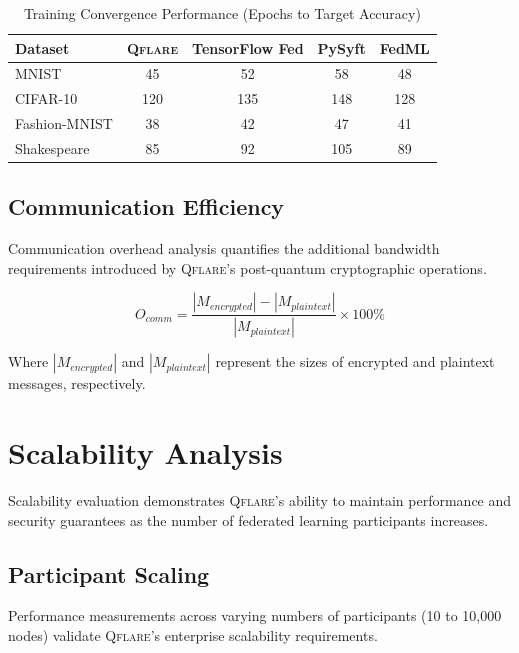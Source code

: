 ﻿\documentclass[12pt,a4paper,twoside]{book}
\newcommand{\qflare}{\textsc{Qflare}}
\begin{document}
\begin{table}[htbp]
\centering
\caption{Training Convergence Performance (Epochs to Target Accuracy)}
\label{tab:convergence-performance}
\begin{tabular}{@{}lcccc@{}}
\toprule
Dataset & \qflare{} & TensorFlow Fed & PySyft & FedML \\
\midrule
MNIST & 45 & 52 & 58 & 48 \\
CIFAR-10 & 120 & 135 & 148 & 128 \\
Fashion-MNIST & 38 & 42 & 47 & 41 \\
Shakespeare & 85 & 92 & 105 & 89 \\
\bottomrule
\end{tabular}
\end{table}

\subsection{Communication Efficiency}
\label{subsec:communication-efficiency}

Communication overhead analysis quantifies the additional bandwidth requirements introduced by \qflare{}'s post-quantum cryptographic operations.

\begin{equation}
\label{eq:comm-overhead}
O_{comm} = \frac{|M_{encrypted}| - |M_{plaintext}|}{|M_{plaintext}|} \times 100\%
\end{equation}

Where $|M_{encrypted}|$ and $|M_{plaintext}|$ represent the sizes of encrypted and plaintext messages, respectively.

\section{Scalability Analysis}
\label{sec:scalability-analysis}

Scalability evaluation demonstrates \qflare{}'s ability to maintain performance and security guarantees as the number of federated learning participants increases.

\subsection{Participant Scaling}
\label{subsec:participant-scaling}

Performance measurements across varying numbers of participants (10 to 10,000 nodes) validate \qflare{}'s enterprise scalability requirements.
\end{document}

